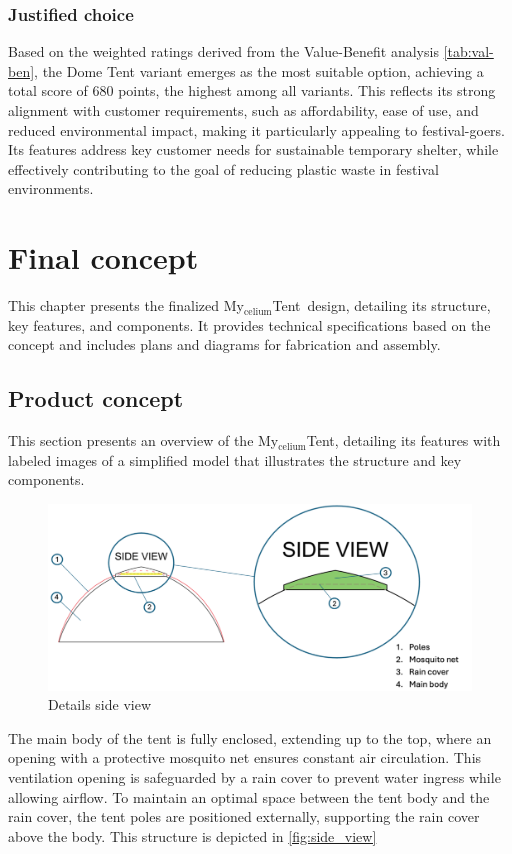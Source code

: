 \documentclass{article}
\newcommand{\myc}{My$_{\text{celium}}$Tent}
\begin{document}
\subsubsection{Justified choice}
Based on the weighted ratings derived from the Value-Benefit analysis \autoref{tab:val-ben},
the Dome Tent variant emerges as the most suitable option, achieving a total score of 680
points, the highest among all variants. This reflects its strong alignment with customer
requirements, such as affordability, ease of use, and reduced environmental impact,
making it particularly appealing to festival-goers. Its features address key customer
needs for sustainable temporary shelter, while effectively contributing to the goal of
reducing plastic waste in festival environments.

\section{Final concept}
\label{sec:final_concept}
This chapter presents the finalized \myc\ design, detailing its structure, key features,
and components. It provides technical specifications based on the concept and includes plans
and diagrams for fabrication and assembly.

\subsection{Product concept}
This section presents an overview of the \myc, detailing its features with labeled
images of a simplified model that illustrates the structure and key components.

\begin{figure}[ht!]
    \centering
    \includegraphics[width=.85\textwidth]{media/side_view.png}
    \caption{Details side view}
    \label{fig:side_view}
\end{figure}

The main body of the tent is fully enclosed, extending up to the top, where an opening with a
protective mosquito net ensures constant air circulation. This ventilation opening is
safeguarded by a rain cover to prevent water ingress while allowing airflow. To maintain an
optimal space between the tent body and the rain cover, the tent poles are positioned
externally, supporting the rain cover above the body. This structure is depicted in \autoref{fig:side_view}
\end{document}
